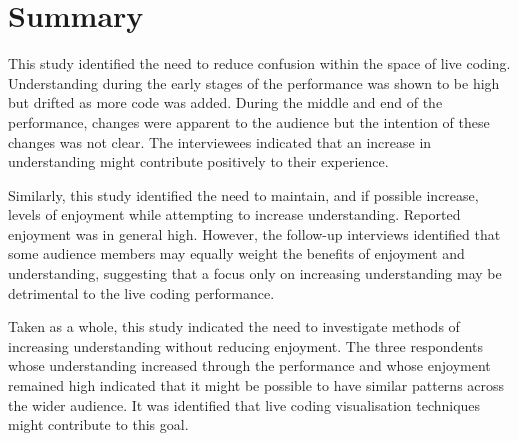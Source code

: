 \section{Summary}

This study identified the need to reduce confusion within the space of live coding. Understanding during the early stages of the performance was shown to be high but drifted as more code was added. During the middle and end of the performance, changes were apparent to the audience but the intention of these changes was not clear. The interviewees indicated that an increase in understanding might contribute positively to their experience.

Similarly, this study identified the need to maintain, and if possible increase, levels of enjoyment while attempting to increase understanding. Reported enjoyment was in general high. However, the follow-up interviews identified that some audience members may equally weight the benefits of enjoyment and understanding, suggesting that a focus only on increasing understanding may be detrimental to the live coding performance.

Taken as a whole, this study indicated the need to investigate methods of increasing understanding without reducing enjoyment. The three respondents whose understanding increased through the performance and whose enjoyment remained high indicated that it might be possible to have similar patterns across the wider audience. It was identified that live coding visualisation techniques might contribute to this goal.


